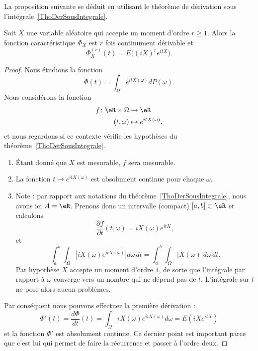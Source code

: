 La proposition suivante se déduit en utilisant le théorème de dérivation sous l'intégrale~\ref{ThoDerSousIntegrale}.
\begin{proposition}     \label{PropDerFnCaract}
	Soit \( X\) une variable aléatoire qui accepte un moment d'ordre \( r\geq 1\). Alors la fonction caractéristique \( \Phi_X\) est \( r\) fois continument dérivable et
	\begin{equation}
		\Phi_X^{(r)}(t)=E\big( (iX)^r e^{itX} \big).
	\end{equation}
\end{proposition}

\begin{proof}
	Nous étudions la fonction
	\begin{equation}
		\Phi(t)=\int_{\Omega} e^{itX(\omega)}dP(\omega).
	\end{equation}
	Nous considérons la fonction
	\begin{equation}
		\begin{aligned}
			f\colon \eR\times\Omega & \to \eR                   \\
			(t,\omega)              & \mapsto  e^{itX(\omega)}.
		\end{aligned}
	\end{equation}
	et nous regardons si ce contexte vérifie les hypothèses du théorème~\ref{ThoDerSousIntegrale}.
	\begin{enumerate}
		\item
		      Étant donné que \( X\) est mesurable, \( f\) sera mesurable.
		\item
		      La fonction \( t\mapsto e^{itX(\omega)}\) est absolument continue pour chaque \( \omega\).
		\item
		      Note : par rapport aux notations du théorème~\ref{ThoDerSousIntegrale}, nous avons ici \( A=\eR\). Prenons donc un intervalle (compact) \( \mathopen[ a , b \mathclose]\subset\eR\) et calculons
		      \begin{equation}        \label{EqfpfpttoiXieitXo}
			      \frac{ \partial f }{ \partial t }(t,\omega)=iX(\omega) e^{itX},
		      \end{equation}
		      et
		      \begin{equation}
			      \int_a^b\int_{\Omega}\left| iX(\omega) e^{itX(\omega)} \right| d\omega\,dt=\int_a^b\int_{\Omega}| X(\omega) |d\omega\,dt.
		      \end{equation}
		      Par hypothèse \( X\) accepte un moment d'ordre \( 1\), de sorte que l'intégrale par rapport à \( \omega\) converge vers un nombre qui ne dépend pas de \( t\). L'intégrale sur \( t\) ne pose alors aucun problèmes.
	\end{enumerate}
	Par conséquent nous pouvons effectuer la première dérivation :
	\begin{equation}
		\Phi'(t)=\frac{ d\Phi }{ dt }(t)=\int_{\Omega}iX(\omega) e^{itX(\omega)}d\omega=E(iX e^{itX})
	\end{equation}
	et la fonction \( \Phi'\) est absolument continue. Ce dernier point est important parce que c'est lui qui permet de faire la récurrence et passer à l'ordre deux.


\end{proof}
